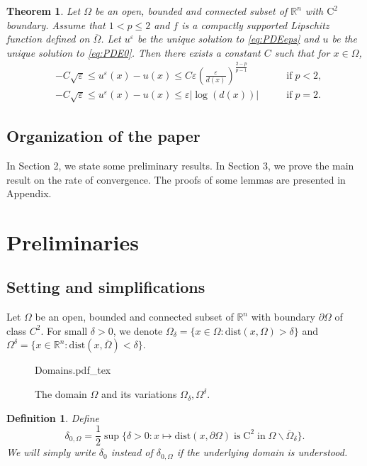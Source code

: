 \documentclass[12pt,reqno]{amsart}
\numberwithin{figure}{section}
\theoremstyle{plain}
\newtheorem{thm}{Theorem}[section]
\newtheorem{defn}{Definition}
\theoremstyle{remark}
\numberwithin{equation}{section}
\newcommand{\R}{\mathbb{R}}
\newcommand{\rmC}{\mathrm{C}}
\newcommand{\incfig}[1]{%
    \def\svgwidth{\columnwidth}
    {#1.pdf_tex}
}
\begin{document}
\begin{thm}\label{main_thm2} Let $\Omega$ be an open, bounded and connected subset of $\R^n$ with $\mathrm{C}^2$ boundary. Assume that $1 < p\leq 2$ and $f$ is a compactly supported Lipschitz function defined on $\overline{\Omega}$. Let $u^\varepsilon$ be the unique solution to \eqref{eq:PDEeps} and $u$ be the unique solution to \eqref{eq:PDE0}. Then there exists a constant $C$ such that for $x\in \Omega$,
\begin{align*}
    &-C\sqrt{\varepsilon}\leq  u^\varepsilon(x) - u(x)\leq  C\varepsilon \left(\frac{\varepsilon}{d(x)}\right)^{\frac{2-p}{p-1}} &\qquad\text{if}\; p < 2,\\
    &-C\sqrt{\varepsilon}\leq  u^\varepsilon(x) - u(x)\leq  \varepsilon|\log(d(x))| &\qquad\text{if}\; p = 2.
\end{align*}
\end{thm}



\subsection*{Organization of the paper} In Section 2, we state some preliminary results. In Section 3, we prove the main result on the rate of convergence. The proofs of some lemmas are presented in Appendix.

\section{Preliminaries}\label{sec:prelim} 
\subsection{Setting and simplifications} Let $\Omega$ be an open, bounded and connected subset of $\mathbb{R}^n$ with boundary $\partial\Omega$ of class $C^2$. For small $\delta>0$, we denote $\Omega_\delta = \{x\in \Omega: \mathrm{dist}(x,\Omega) > \delta\}$ and $\Omega^\delta = \{x\in \mathbb{R}^n: \mathrm{dist}(x,\overline{\Omega}) < \delta\}$. 
\begin{figure}[ht]
    \centering
    \def\svgwidth{0.35\columnwidth}
    {Domains.pdf_tex}
    \caption{The domain $\Omega$ and its variations $\Omega_\delta, \Omega^\delta$.}
    \label{fig:Domains}
\end{figure}

\begin{defn} Define
\begin{equation}\label{def:delta_0}
    \delta_{0,\Omega} =\frac{1}{2}\sup \big\{ \delta > 0: x\mapsto\mathrm{dist}(x,\partial\Omega)\;\text{is}\;\rmC^2\;\text{in}\;\Omega\backslash\overline{\Omega}_{\delta} \big\}.
\end{equation}
We will simply write $\delta_0$ instead of $\delta_{0,\Omega}$ if the underlying domain is understood.
\end{defn}
\end{document}
